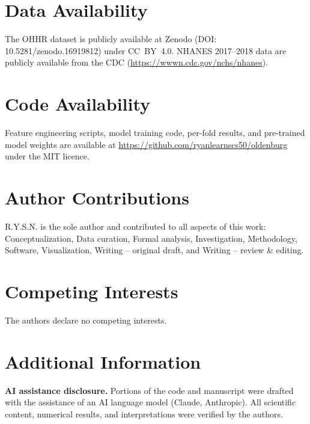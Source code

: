 \documentclass[12pt,a4paper]{article}
\begin{document}
\section*{Data Availability}

The OHHR dataset is publicly available at Zenodo (DOI:
10.5281/zenodo.16919812) under CC~BY~4.0.  NHANES 2017--2018 data are
publicly available from the CDC (\url{https://wwwn.cdc.gov/nchs/nhanes}).

\section*{Code Availability}

Feature engineering scripts, model training code, per-fold results, and
pre-trained model weights are available at
\url{https://github.com/ryanlearnscs50/oldenburg} under the MIT licence.

\section*{Author Contributions}

R.Y.S.N. is the sole author and contributed to all aspects of this work:
Conceptualization, Data curation, Formal analysis, Investigation, Methodology,
Software, Visualization, Writing -- original draft, and Writing -- review \&
editing.

\section*{Competing Interests}

The authors declare no competing interests.

\section*{Additional Information}

\textbf{AI assistance disclosure.}  Portions of the code and manuscript were
drafted with the assistance of an AI language model (Claude, Anthropic).
All scientific content, numerical results, and interpretations were verified
by the authors.
\end{document}
